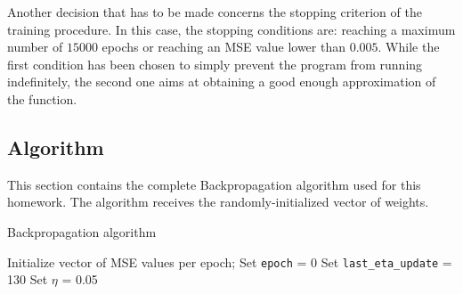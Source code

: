 \documentclass[12pt]{article}
\begin{document}
Another decision that has to be made concerns the stopping criterion of the training procedure.
In this case, the stopping conditions are: reaching a maximum number of $15000$ epochs or reaching an MSE value lower than $0.005$.
While the first condition has been chosen to simply prevent the program from running indefinitely, the second one aims at obtaining a good enough approximation of the function.

\subsection{Algorithm}

This section contains the complete Backpropagation algorithm used for this homework.
The algorithm receives the randomly-initialized vector of weights.

\begin{algorithm}
  \caption{Backpropagation algorithm}
  \label{alg:bp}
  \begin{algorithmic}[1]
    \State Initialize vector of MSE values per epoch;
    \State Set \verb|epoch| = 0
    \State Set \verb|last_eta_update| = 130
    \State Set $\eta$ = 0.05

  \end{algorithmic}
\end{algorithm}
\end{document}
